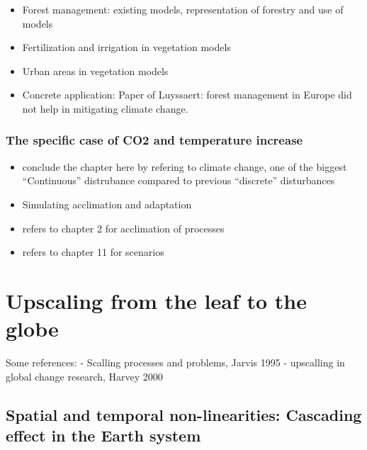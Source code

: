 \documentclass[
  oneside]{book}
\providecommand{\tightlist}{%
  \setlength{\itemsep}{0pt}\setlength{\parskip}{0pt}}
\begin{document}
\begin{itemize}
\tightlist
\item
  Forest management: existing models, representation of forestry and use of models
\item
  Fertilization and irrigation in vegetation models
\item
  Urban areas in vegetation models
\item
  Concrete application: Paper of Luyssaert: forest management in Europe did not help in mitigating climate change.
\end{itemize}

\hypertarget{the-specific-case-of-co2-and-temperature-increase}{%
\subsection{The specific case of CO2 and temperature increase}\label{the-specific-case-of-co2-and-temperature-increase}}

\begin{itemize}
\tightlist
\item
  conclude the chapter here by refering to climate change, one of the biggest ``Continuous'' distrubance compared to previous ``discrete'' disturbances
\item
  Simulating acclimation and adaptation
\item
  refers to chapter 2 for acclimation of processes
\item
  refers to chapter 11 for scenarios
\end{itemize}

\hypertarget{upscaling-from-the-leaf-to-the-globe}{%
\chapter{Upscaling from the leaf to the globe}\label{upscaling-from-the-leaf-to-the-globe}}


Some references:
- Scalling processes and problems, Jarvis 1995
- upscalling in global change research, Harvey 2000

\hypertarget{spatial-and-temporal-non-linearities-cascading-effect-in-the-earth-system}{%
\section{Spatial and temporal non-linearities: Cascading effect in the Earth system}\label{spatial-and-temporal-non-linearities-cascading-effect-in-the-earth-system}}
\end{document}
